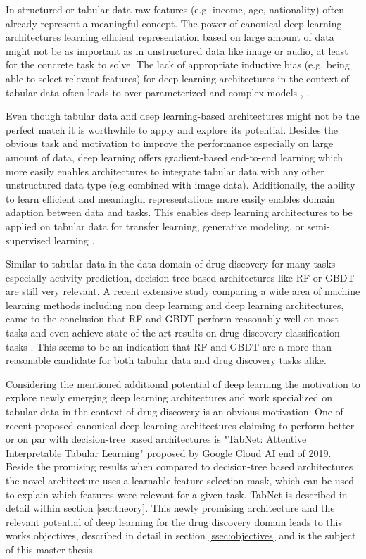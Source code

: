 \documentclass[../main.tex]{subfiles}
\begin{document}
In structured or tabular data raw features (e.g. income, age, nationality) often already represent a meaningful concept. The power of canonical deep learning architectures learning efficient representation based on large amount of data might not be as important as in unstructured data like image or audio, at least for the concrete task to solve. The lack of appropriate inductive bias (e.g. being able to select relevant features) for deep learning architectures in the context of tabular data often leads to over-parameterized and complex models \cite{Goodfellow-et-al-2016}, \cite{ke_tabnn_2018}. 

Even though tabular data and deep learning-based architectures might not be the perfect match it is worthwhile to apply and explore its potential. Besides the obvious task and motivation to improve the performance especially on large amount of data, deep learning offers gradient-based end-to-end learning which more easily enables architectures to integrate tabular data with any other unstructured data type (e.g combined with image data). Additionally, the ability to learn efficient and meaningful representations more easily enables domain adaption between data and tasks.
This enables deep learning architectures to be applied on tabular data for transfer learning, generative modeling, or semi-supervised learning \cite{arik_tabnet_2020}.
\newline

Similar to tabular data in the data domain of drug discovery for many tasks especially activity prediction, decision-tree based architectures like RF or GBDT are still very relevant. A recent extensive study comparing a wide area of machine learning methods including non deep learning and deep learning architectures, came to the conclusion that RF and GBDT perform reasonably well on most tasks and even achieve state of the art results on drug discovery classification tasks \cite{jiang_could_2021}. This seems to be an indication that RF and GBDT are a more than reasonable candidate for both tabular data and drug discovery tasks alike. 
\newline

Considering the mentioned additional potential of deep learning the motivation to explore newly emerging deep learning architectures and work specialized on tabular data in the context of drug discovery is an obvious motivation. 
One of recent proposed canonical deep learning architectures claiming to perform better or on par with decision-tree based architectures is "TabNet: Attentive Interpretable Tabular Learning" \cite{arik_tabnet_2020} proposed by Google Cloud AI end of 2019. Beside the promising results when compared to decision-tree based architectures the novel architecture uses a learnable feature selection mask, which can be used to explain which features were relevant for a given task. TabNet is described in detail within section \ref{sec:theory}.
This newly promising architecture and the relevant potential of deep learning for the drug discovery domain leads to this works objectives, described in detail in section \ref{ssec:objectives} and is the subject of this master thesis.
\newline
\end{document}
